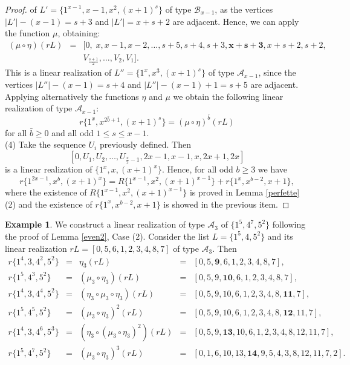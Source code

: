 \documentclass{amsart}
\theoremstyle{definition}
\newtheorem{ex}[prop]{Example}
\numberwithin{equation}{section}
\def\A{\mathcal{A}}
\def\B{\mathcal{B}}
\begin{document}
\begin{proof}
 of $L'=\{1^{x-1}, x-1, x^2, (x+1)^s\}$ of type $\B_{x-1}$, as the vertices $|L'|-(x-1)=s+3$ and
$|L'|=x+s+2$ are adjacent.
Hence, we can apply the function $\mu$, obtaining:
$$\begin{array}{rcl}
(\mu\circ\eta)(rL) &= & [0,\; x, x-1,x-2,\ldots,s+5, s+4, s+3, \bm{x+s+3}, x+s+2, s+2,\\
&&  V_{\frac{s+1}{2}}, \ldots,V_2,V_1  ].
\end{array}$$
This is a linear realization  of $L''=\{1^{x}, x^{3}, (x+1)^s\}$ of type $\A_{x-1}$, since
the vertices $|L''|-(x-1)=s+4$ and $|L''|-(x-1)+1=s+5$ are adjacent.
Applying alternatively the functions $\eta$ and $\mu$ we obtain the following linear realization of type $\A_{x-1}$:
$$r\{1^{x}, x^{2\bar b+1}, (x+1)^{s} \}=(\mu \circ \eta)^{\bar b} (rL)$$
for all $\bar b\geq 0$ and all odd $1\leq s\leq x-1$. \\
(4) Take the sequence $U_i$ previously defined. Then
$$[0,U_1,U_2,\ldots,U_{\frac{x}{2}-1},2x-1, x-1, x, 2x+1, 2x]$$
is a linear realization of $\{1^{x}, x, (x+1)^x \}$.
Hence, for all odd $b\geq 3$ we have
$$r\{1^{2x-1} , x^b, (x+1)^x\}= R\{1^{x-1}, x^2, (x+1)^{x-1} \} + r\{1^{x}, x^{b-2}, x+1 \},$$
where the existence of $R\{1^{x-1}, x^2, (x+1)^{x-1}\}$ is proved in Lemma \ref{perfette}(2) and
the existence of $r\{1^{x}, x^{b-2}, x+1 \}$ is showed in the previous item.
\end{proof}


\begin{ex}
We construct a  linear realization of  type $\A_3$ of $\{1^{5},4^7,5^2\}$
following the proof of Lemma \ref{even2}, Case (2).
Consider the list $L=\{1^5,4,5^2\}$ and its linear realization
$rL=[0,5,6,1,2,3,4,8,7]$  of type $\A_3$. Then
$$\begin{array}{rcccl}
r\{1^4,3,4^2,5^2\} & = & \eta_3(rL) & =& [0,5,\bm{9},6,1,2,3,4,8,7], \\
r\{1^5,4^3,5^2\} & = & (\mu_3\circ\eta_3)(rL) & =& [0,5,9,\bm{10},6,1,2,3,4,8,7], \\
r\{1^4,3,4^4,5^2\} & = & (\eta_3\circ \mu_3\circ \eta_3)(rL) & =& [0,5,9,10,6,1,2,3,4,8,\bm{11},7], \\
r\{1^5,4^5,5^2\} & = & (\mu_3\circ\eta_3)^2(rL) & =& [0,5,9,10,6,1,2,3,4,8,\bm{12},11,7], \\
r\{1^4,3,4^6,5^3\} & = & (\eta_3\circ(\mu_3\circ\eta_3)^2)(rL) & =& [0,5,9,\bm{13},10,6,1,2,3,4,8,12,11,7], \\
r\{1^5,4^7,5^2\} & = & (\mu_3\circ\eta_3)^3(rL) & =& [0,1,6,10,13,\bm{14},9,5,4,3,8,12,11,7,2].
\end{array}$$
\end{ex}
\end{document}
